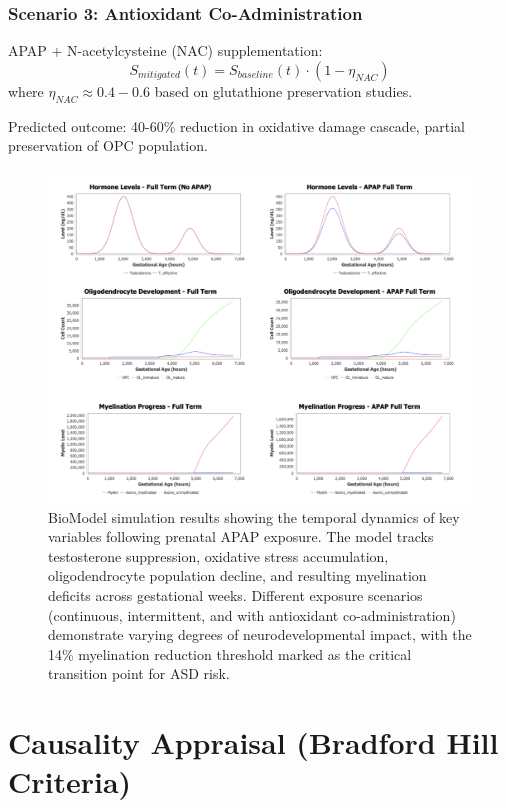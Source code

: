 \documentclass[11pt]{article}
\let\oldsection\section
\renewcommand{\section}[1]{\oldsection{#1}\setlength{\leftskip}{0em}}
\let\oldsubsubsection\subsubsection
\renewcommand{\subsubsection}[1]{\oldsubsubsection{#1}\setlength{\leftskip}{1.5em}}
\begin{document}
\subsubsection{Scenario 3: Antioxidant Co-Administration}
APAP + N-acetylcysteine (NAC) supplementation:
\begin{equation}
S_{mitigated}(t) = S_{baseline}(t) \cdot (1 - \eta_{NAC})
\end{equation}
where $\eta_{NAC} \approx 0.4-0.6$ based on glutathione preservation studies.

Predicted outcome: 40-60\% reduction in oxidative damage cascade, partial preservation of OPC population.

\begin{figure}[h]
\centering
\includegraphics[width=\textwidth]{../assets/biomodel-results.png}
\caption{BioModel simulation results showing the temporal dynamics of key variables following prenatal APAP exposure. The model tracks testosterone suppression, oxidative stress accumulation, oligodendrocyte population decline, and resulting myelination deficits across gestational weeks. Different exposure scenarios (continuous, intermittent, and with antioxidant co-administration) demonstrate varying degrees of neurodevelopmental impact, with the 14\% myelination reduction threshold marked as the critical transition point for ASD risk.}
\label{fig:biomodel-results}
\end{figure}

\section{Causality Appraisal (Bradford Hill Criteria)}
\end{document}
